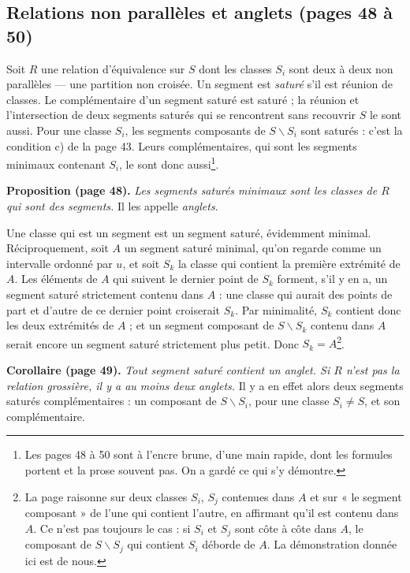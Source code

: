 \documentclass[11pt,a4paper]{article}
\begin{document}
\subsection*{Relations non parallèles et anglets (pages 48 à 50)}

Soit $R$ une relation d'équivalence sur $S$ dont les classes $S_i$ sont deux
à deux non parallèles --- une partition non croisée. Un segment est
\emph{saturé} s'il est réunion de classes. Le complémentaire d'un segment
saturé est saturé ; la réunion et l'intersection de deux segments saturés
qui se rencontrent sans recouvrir $S$ le sont aussi. Pour une classe $S_i$,
les segments composants de $S \smallsetminus S_i$ sont saturés : c'est la
condition c) de la page 43. Leurs complémentaires, qui sont les segments
minimaux contenant $S_i$, le sont donc aussi\footnote{Les pages 48 à 50 sont
à l'encre brune, d'une main rapide, dont les formules portent et la prose
souvent pas. On a gardé ce qui s'y démontre.}.

\textbf{Proposition (page 48).} \emph{Les segments saturés minimaux sont les
classes de $R$ qui sont des segments.} Il les appelle \emph{anglets}.

Une classe qui est un segment est un segment saturé, évidemment minimal.
Réciproquement, soit $A$ un segment saturé minimal, qu'on regarde comme un
intervalle ordonné par $u$, et soit $S_k$ la classe qui contient la première
extrémité de $A$. Les éléments de $A$ qui suivent le dernier point de $S_k$
forment, s'il y en a, un segment saturé strictement contenu dans $A$ : une
classe qui aurait des points de part et d'autre de ce dernier point
croiserait $S_k$. Par minimalité, $S_k$ contient donc les deux extrémités
de $A$ ; et un segment composant de $S \smallsetminus S_k$ contenu dans $A$
serait encore un segment saturé strictement plus petit. Donc $S_k =
A$\footnote{La page raisonne sur deux classes $S_i$, $S_j$ contenues dans $A$
et sur « le segment composant » de l'une qui contient l'autre, en affirmant
qu'il est contenu dans $A$. Ce n'est pas toujours le cas : si $S_i$ et $S_j$
sont côte à côte dans $A$, le composant de $S \smallsetminus S_j$ qui contient
$S_i$ déborde de $A$. La démonstration donnée ici est de nous.}.

\textbf{Corollaire (page 49).} \emph{Tout segment saturé contient un anglet.
Si $R$ n'est pas la relation grossière, il y a au moins deux anglets.} Il y
a en effet alors deux segments saturés complémentaires : un composant de $S
\smallsetminus S_i$, pour une classe $S_i \neq S$, et son complémentaire.
\end{document}
